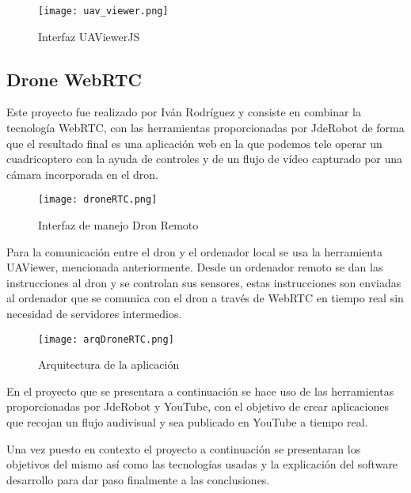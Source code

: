\begin{figure}[H]
    \centering
    \texttt{[image: uav\_viewer.png]}
    \caption{Interfaz UAViewerJS}
\end{figure}

\subsection{Drone WebRTC}

Este proyecto fue realizado por Iván Rodríguez y consiste en combinar la tecnología WebRTC, con las herramientas proporcionadas por JdeRobot de forma que el resultado final es una aplicación web en la que podemos tele operar un cuadricoptero con la ayuda de controles y de un flujo de vídeo capturado por una cámara incorporada en el dron.

\begin{figure}[H]
    \centering
    \texttt{[image: droneRTC.png]}
    \caption{Interfaz de manejo Dron Remoto}
\end{figure}

Para la comunicación entre el dron y el ordenador local se usa la herramienta UAViewer, mencionada anteriormente. Desde un ordenador remoto se dan las instrucciones al dron y se controlan sus sensores, estas instrucciones son enviadas al ordenador que se comunica con el dron a través de WebRTC en tiempo real sin necesidad de servidores intermedios.

\begin{figure}[H]
    \centering
    \texttt{[image: arqDroneRTC.png]}
    \caption{Arquitectura de la aplicación}
\end{figure}

En el proyecto que se presentara a continuación se hace uso de las herramientas proporcionadas por JdeRobot y YouTube, con el objetivo de crear aplicaciones que recojan un flujo audivisual y sea publicado en YouTube a tiempo real.

Una vez puesto en contexto el proyecto a continuación se presentaran los objetivos del mismo así como las tecnologías usadas y la explicación del software desarrollo para dar paso finalmente a las conclusiones.
